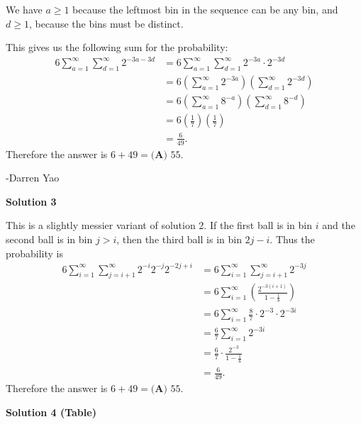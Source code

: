 \begin{enumerate}
 We have $a\geq1$ because the leftmost bin in the sequence can be any bin, and $d\geq1$, because the bins must be distinct.

 This gives us the following sum for the probability:
 \begin{align*} 6 \sum_{a=1}^{\infty} \sum_{d=1}^{\infty} 2^{-3a-3d} &= 6 \sum_{a=1}^{\infty} \sum_{d=1}^{\infty} 2^{-3a} \cdot 2^{-3d} \\ &= 6 \left( \sum_{a=1}^{\infty} 2^{-3a} \right) \left( \sum_{d=1}^{\infty} 2^{-3d} \right) \\ &= 6 \left( \sum_{a=1}^{\infty} 8^{-a} \right) \left( \sum_{d=1}^{\infty} 8^{-d} \right) \\ &= 6 \left( \frac{1}{7} \right) \left( \frac{1}{7} \right) \\ &= \frac{6}{49} .\end{align*}
Therefore the answer is $6 + 49 = \boxed{\textbf{(A) }55}$.

 -Darren Yao

 



\textbf{Solution 3}

This is a slightly messier variant of solution 2. If the first ball is in bin $i$ and the second ball is in bin $j>i$, then the third ball is in bin $2j-i$. Thus the probability is
 \begin{align*} 6\sum_{i=1}^{\infty}\sum_{j=i+1}^\infty2^{-i}2^{-j}2^{-2j+i}&=6\sum_{i=1}^{\infty}\sum_{j=i+1}^\infty2^{-3j}\\ &=6\sum_{i=1}^{\infty}\left(\frac{2^{-3(i+1)}}{1-\frac{1}{8}}\right)\\ &=6\sum_{i=1}^\infty\frac{8}{7}\cdot2^{-3}\cdot2^{-3i}\\ &=\frac{6}{7}\sum_{i=1}^\infty2^{-3i}\\ &=\frac{6}{7}\cdot\frac{2^{-3}}{1-\frac18}\\ &=\frac{6}{49}. \end{align*}
Therefore the answer is $6 + 49 = \boxed{\textbf{(A) }55}$.

 



\textbf{Solution 4 (Table)}


\end{enumerate}
